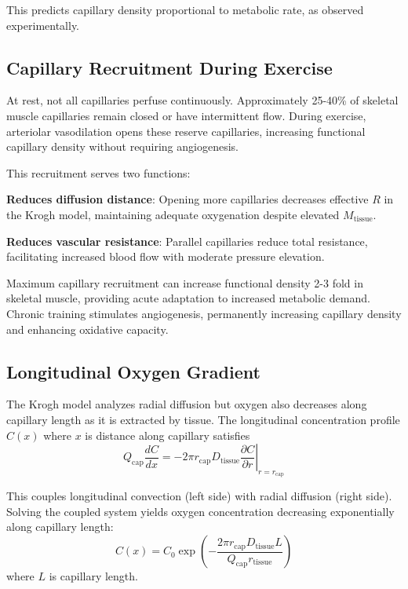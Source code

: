 \documentclass[12pt,a4paper]{article}
\theoremstyle{remark}
\begin{document}
This predicts capillary density proportional to metabolic rate, as observed experimentally.

\subsection{Capillary Recruitment During Exercise}

At rest, not all capillaries perfuse continuously. Approximately 25-40\% of skeletal muscle capillaries remain closed or have intermittent flow. During exercise, arteriolar vasodilation opens these reserve capillaries, increasing functional capillary density without requiring angiogenesis.

This recruitment serves two functions:

\textbf{Reduces diffusion distance}: Opening more capillaries decreases effective $R$ in the Krogh model, maintaining adequate oxygenation despite elevated $M_{\mathrm{tissue}}$.

\textbf{Reduces vascular resistance}: Parallel capillaries reduce total resistance, facilitating increased blood flow with moderate pressure elevation.

Maximum capillary recruitment can increase functional density 2-3 fold in skeletal muscle, providing acute adaptation to increased metabolic demand. Chronic training stimulates angiogenesis, permanently increasing capillary density and enhancing oxidative capacity.

\subsection{Longitudinal Oxygen Gradient}

The Krogh model analyzes radial diffusion but oxygen also decreases along capillary length as it is extracted by tissue. The longitudinal concentration profile $C(x)$ where $x$ is distance along capillary satisfies
\begin{equation}
Q_{\mathrm{cap}} \frac{dC}{dx} = -2\pi r_{\mathrm{cap}} D_{\mathrm{tissue}} \left.\frac{\partial C}{\partial r}\right|_{r=r_{\mathrm{cap}}}
\end{equation}

This couples longitudinal convection (left side) with radial diffusion (right side). Solving the coupled system yields oxygen concentration decreasing exponentially along capillary length:
\begin{equation}
C(x) = C_{0} \exp\left(-\frac{2\pi r_{\mathrm{cap}} D_{\mathrm{tissue}} L}{Q_{\mathrm{cap}} r_{\mathrm{tissue}}}\right)
\end{equation}
where $L$ is capillary length.
\end{document}
